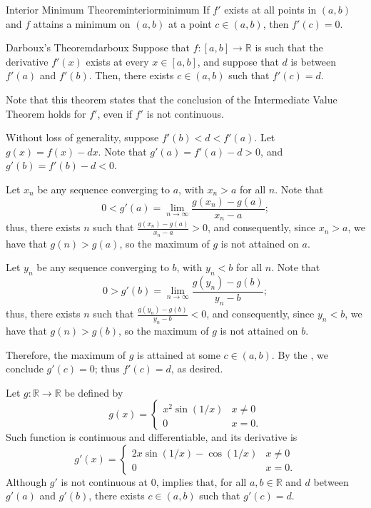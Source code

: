 \begin{cor}{Interior Minimum Theorem}{interiorminimum}
	If \(f'\) exists at all points in \((a, b)\) and \(f\) attains a minimum on \((a, b)\) at a point \(c \in (a, b)\), then \(f'(c) = 0\).
\end{cor}

\begin{thm}{Darboux's Theorem}{darboux}
	Suppose that \(f\colon [a, b] \to \mathbb{R}\) is such that the derivative \(f'(x)\) exists at every \(x \in [a, b]\), and suppose that \(d\) is between \(f'(a)\) and \(f'(b)\). Then, there exists \(c \in (a, b)\) such that \(f'(c) = d\).
\end{thm}

Note that this theorem states that the conclusion of the Intermediate Value Theorem holds for \(f'\), even if \(f'\) is not continuous.

\begin{dem}{}{}
	Without loss of generality, suppose \(f'(b) < d < f'(a)\).
	Let \(g(x) = f(x) - dx\). Note that \(g'(a) = f'(a) - d > 0\), and  \(g'(b) = f'(b) - d < 0\).

	Let \(x_n\) be any sequence converging to \(a\), with \(x_n > a\) for all \(n\). Note that \[
		0 < g'(a) = \lim_{n \to \infty} \frac{g(x_n) - g(a)}{x_n - a};
	\]
	thus, there exists \(n\) such that \(\frac{g(x_n) - g(a)}{x_n - a} > 0\), and consequently, since \(x_n > a\), we have that \(g(n) > g(a)\), so the maximum of \(g\) is not attained on \(a\).

	Let \(y_n\) be any sequence converging to \(b\), with \(y_n < b\) for all \(n\). Note that \[
		0 > g'(b) = \lim_{n \to \infty} \frac{g(y_n) - g(b)}{y_n - b};
	\]
	thus, there exists \(n\) such that \(\frac{g(y_n) - g(b)}{y_n - b} < 0\), and consequently, since \(y_n < b\), we have that \(g(n) > g(b)\), so the maximum of \(g\) is not attained on \(b\).

	Therefore, the maximum of \(g\) is attained at some \(c \in (a, b)\). By the , we conclude \(g'(c) = 0\); thus \(f'(c) = d\), as desired.
\end{dem}

\begin{exmp}{}{}
	Let \(g\colon \mathbb{R} \to \mathbb{R}\) be defined by \[
		g(x) = 
		\begin{cases}
			x^2\sin(1/x) & x \neq 0 \\
			0 & x = 0.
		\end{cases}
	\]
	Such function is continuous and differentiable, and its derivative is \[
		g'(x) = 
		\begin{cases}
			2x \sin(1/x) - \cos(1/x) & x \neq 0 \\
			0 & x = 0.
		\end{cases}
	\]
	Although \(g'\) is not continuous at \(0\),  implies that, for all \(a, b \in \mathbb{R}\) and \(d\) between \(g'(a)\) and \(g'(b)\), there exists \(c \in (a, b)\) such that \(g'(c) = d\).
\end{exmp}

